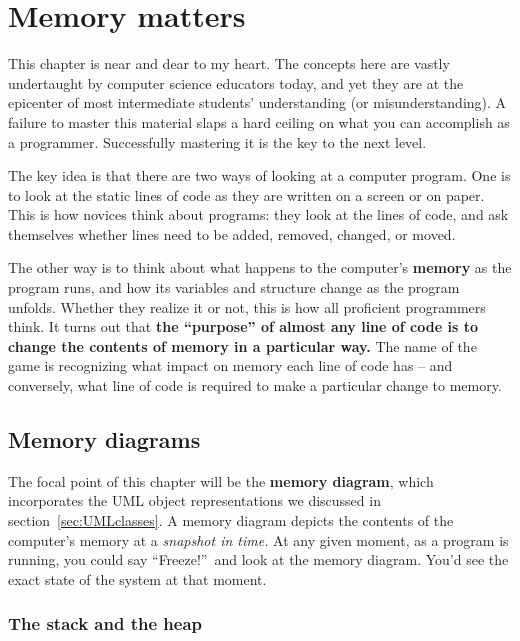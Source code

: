 
\chapter{Memory matters}
\label{ch:memoryMatters}

This chapter is near and dear to my heart. The concepts here are vastly
undertaught by computer science educators today, and yet they are at the
epicenter of most intermediate students' understanding (or misunderstanding).
A failure to master this material slaps a hard ceiling on what you can
accomplish as a programmer. Successfully mastering it is the key to the next
level.

The key idea is that there are two ways of looking at a computer program. One
is to look at the static lines of code as they are written on a screen or on
paper. This is how novices think about programs: they look at the lines of
code, and ask themselves whether lines need to be added, removed, changed, or
moved.

The other way is to think about what happens to the computer's \textbf{memory}
as the program runs, and how its variables and structure change as the program
unfolds. Whether they realize it or not, this is how all proficient
programmers think. It turns out that \textbf{the ``purpose'' of almost any line
of code is to change the contents of memory in a particular way.} The name of
the game is recognizing what impact on memory each line of code has -- and
conversely, what line of code is required to make a particular change to
memory.

\section{Memory diagrams}

The focal point of this chapter will be the \textbf{memory diagram}, which
incorporates the UML object representations we discussed in
section~\ref{sec:UMLclasses}. A memory diagram depicts the contents of the
computer's memory at a \textit{snapshot in time.} At any given moment, as a
program is running, you could say ``Freeze!''\ and look at the memory diagram.
You'd see the exact state of the system at that moment.

\subsection{The stack and the heap}


